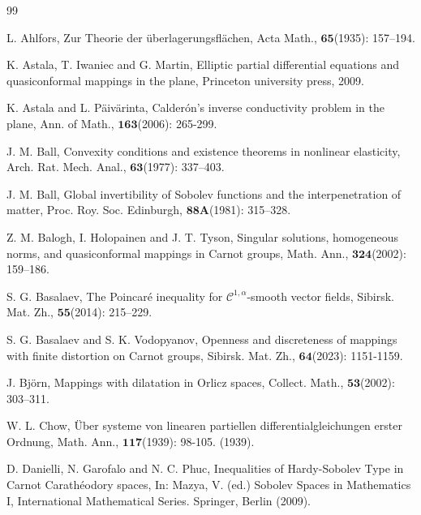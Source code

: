 \documentclass[11pt,twoside]{article}
\theoremstyle{definition}
\theoremstyle{remark}
\begin{document}
\begin{thebibliography}{99}
\balance

 L. Ahlfors, Zur Theorie der \"{u}berlagerungsfl\"{a}chen, Acta Math., $\mathbf{65}$(1935): 157–194.



K. Astala, T. Iwaniec and G. Martin, Elliptic partial differential equations and quasiconformal mappings in the plane, Princeton university press, 2009.


K. Astala and L. P\"{a}iv\"{a}rinta, Calder\'{o}n's inverse conductivity problem in the plane, Ann. of Math., $\mathbf{163}$(2006): 265-299.



 J. M. Ball, Convexity conditions and existence theorems in nonlinear elasticity, Arch. Rat. Mech. Anal., $\mathbf{63}$(1977): 337–403.


 J. M. Ball, Global invertibility of Sobolev functions and the interpenetration of matter, Proc. Roy. Soc. Edinburgh, $\mathbf{88A}$(1981): 315–328.



 Z. M. Balogh, I. Holopainen and J. T. Tyson,  Singular solutions, homogeneous norms, and quasiconformal mappings in Carnot groups, Math. Ann., $\mathbf{324}$(2002): 159–186.


S. G. Basalaev, The Poincar\'{e} inequality for $\mathcal{C}^{1,\alpha}$-smooth vector fields, Sibirsk. Mat. Zh., $\mathbf{55}$(2014): 215–229.


S. G. Basalaev and S. K. Vodopyanov, Openness and discreteness of mappings with finite distortion on Carnot groups, Sibirsk. Mat. Zh., $\mathbf{64}$(2023): 1151-1159.

J. Bj\"{o}rn, Mappings with dilatation in Orlicz spaces, Collect. Math., $\mathbf{53}$(2002): 303–311.




W. L. Chow,  \"{U}ber systeme von linearen partiellen differentialgleichungen erster Ordnung, Math. Ann., $\mathbf{117}$(1939): 98-105. 
(1939). 








D. Danielli, N. Garofalo and N. C. Phuc, Inequalities of Hardy-Sobolev Type in Carnot Carath\'{e}odory spaces, In: Mazya, V. (ed.) Sobolev Spaces in Mathematics I, International
Mathematical Series. Springer, Berlin (2009).



\end{thebibliography}
\end{document}
